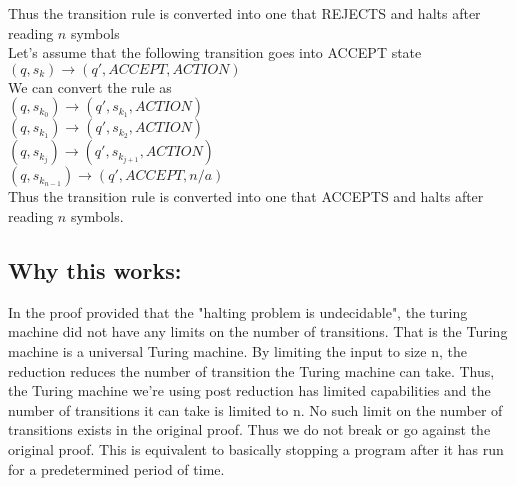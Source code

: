 \documentclass{article}
\theoremstyle{definition}
\theoremstyle{remark}
\theoremstyle{plain}
\begin{document}
Thus the transition rule is converted into one that REJECTS and halts after reading $n$ symbols\\

Let's assume that the following transition goes into ACCEPT state\\
$(q, s_k) \rightarrow (q', ACCEPT, ACTION)$\\

We can convert the rule as\\
$(q, s_{k_0}) \rightarrow (q', s_{k_1}, ACTION)$\\
$(q, s_{k_1}) \rightarrow (q', s_{k_2}, ACTION)$\\
$(q, s_{k_j}) \rightarrow (q', s_{k_{j+1}}, ACTION)$\\
$(q, s_{k_{n-1}}) \rightarrow (q', ACCEPT, n/a)$\\

Thus the transition rule is converted into one that ACCEPTS and halts after reading $n$ symbols.\\


\subsection*{Why this works:}
In the proof provided that the "halting problem is undecidable", the turing machine did not have any limits on the number of transitions. That is the Turing machine is a universal Turing machine. By limiting the input to size n, the reduction reduces the number of transition the Turing machine can take. Thus, the Turing machine we're using post reduction has limited capabilities and the number of transitions it can take is limited to n. No such limit on the number of transitions exists in the original proof. Thus we do not break or go against the original proof.
This is equivalent to basically stopping a program after it has run for a predetermined period of time.
\end{document}
